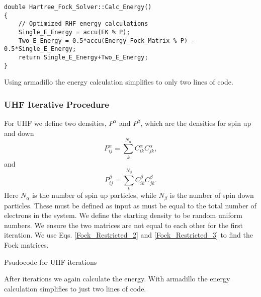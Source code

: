\documentclass[a4paper,norsk,11pt,twoside]{report}
\begin{document}
\begin{lstlisting}
double Hartree_Fock_Solver::Calc_Energy()
{
    // Optimized RHF energy calculations
    Single_E_Energy = accu(EK % P);
    Two_E_Energy = 0.5*accu(Energy_Fock_Matrix % P) - 0.5*Single_E_Energy;
    return Single_E_Energy+Two_E_Energy;
}
\end{lstlisting}
Using armadillo the energy calculation simplifies to only two lines of code. 

\subsubsection{UHF Iterative Procedure}
For UHF we define two densities, $P^{\alpha}$ and $P^{\beta}$, which are the densities for spin up and down
\begin{equation}
P^{\alpha}_{ij} = \sum_k^{N_{\alpha}} C^{\alpha}_{ik} C^{\alpha}_{jk},
\end{equation}
and
\begin{equation}
P^{\beta}_{ij} = \sum_k^{N_{\beta}} C^{\beta}_{ik} C^{\beta}_{jk} .
\end{equation}
Here $N_{\alpha}$ is the number of spin up particles, while
$N_{\beta}$ is the number of spin down particles. These must be
defined as input as must be equal to the total number of electrons in
the system. We define the starting density to be random uniform
numbers. We ensure the two matrices are not equal to each other for
the first iteration. We use Eqs. \eqref{Fock_Restricted_2} and
\eqref{Fock_Restricted_3} to find the Fock matrices. \\

\begin{algorithm}[H]
 \caption{Psudocode for UHF iterations}
 \label{UHF_ITERATIVE_PROCEDURE}
\end{algorithm}
After iterations we again calculate the energy. With armadillo the
energy calculation simplifies to just two lines of code.
\end{document}
